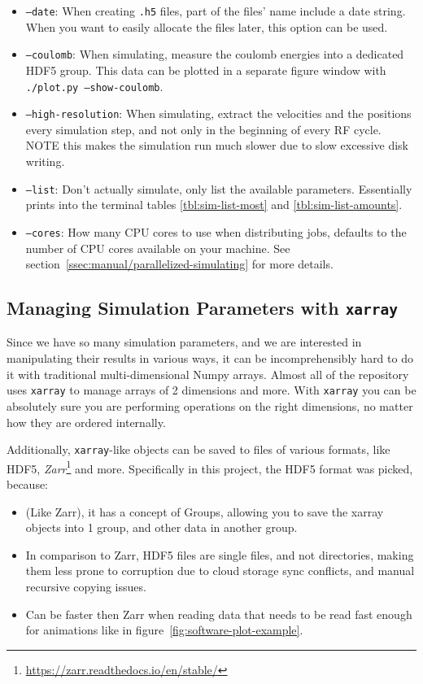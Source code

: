 \begin{itemize}
	\item \texttt{--date}: When creating \texttt{.h5} files, part of the files' name include a date string. When you want to easily allocate the files later, this option can be used.
	\item \texttt{--coulomb}: When simulating, measure the coulomb energies into a dedicated HDF5 group. This data can be plotted in a separate figure window with \texttt{./plot.py --show-coulomb}.
	\item \texttt{--high-resolution}: When simulating, extract the velocities and the positions every simulation step, and not only in the beginning of every RF cycle. NOTE this makes the simulation run much slower due to slow excessive disk writing.
	\item \texttt{--list}: Don't actually simulate, only list the available parameters. Essentially prints into the terminal tables \ref{tbl:sim-list-most} and \ref{tbl:sim-list-amounts}.
	\item \texttt{--cores}: How many CPU cores to use when distributing jobs, defaults to the number of CPU cores available on your machine. See section~\ref{ssec:manual/parallelized-simulating} for more details.
\end{itemize}

\subsection{Managing Simulation Parameters with \texttt{xarray}}

Since we have so many simulation parameters, and we are interested in manipulating their results in various ways, it can be incomprehensibly hard to do it with traditional multi-dimensional Numpy arrays. Almost all of the repository uses \texttt{xarray}\cite{xarray} to manage arrays of 2 dimensions and more. With \texttt{xarray} you can be absolutely sure you are performing operations on the right dimensions, no matter how they are ordered internally.

Additionally, \texttt{xarray}-like objects can be saved to files of various formats, like HDF5\cite{HDF5}, \textit{Zarr}\footnote{\url{https://zarr.readthedocs.io/en/stable/}} and more. Specifically in this project, the HDF5 format was picked, because:

\begin{itemize}
	\item (Like Zarr), it has a concept of Groups, allowing you to save the xarray objects into 1 group, and other data in another group.
	\item In comparison to Zarr, HDF5 files are single files, and not directories, making them less prone to corruption due to cloud storage sync conflicts, and manual recursive copying issues.
	\item Can be faster then Zarr when reading data that needs to be read fast enough for animations like in figure~\ref{fig:software-plot-example}.
\end{itemize}

